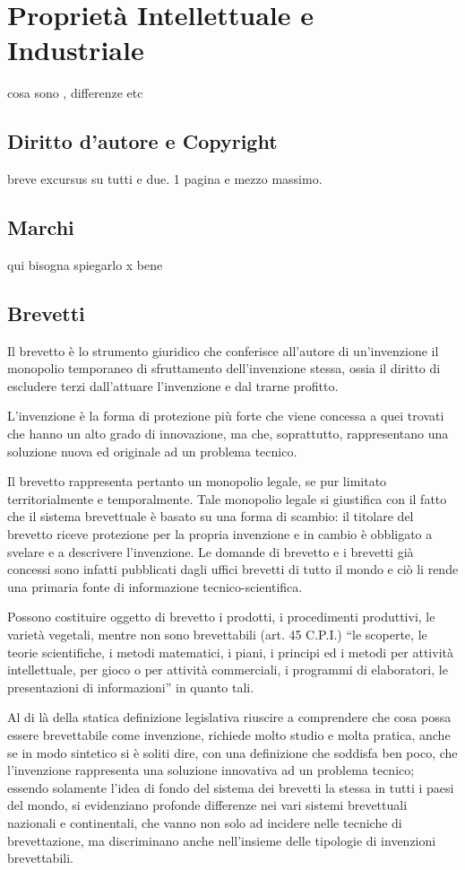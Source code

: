 \chapter{Proprietà Intellettuale e Industriale}
cosa sono , differenze etc
\section{Diritto d'autore e Copyright}
breve excursus su tutti e due. 1 pagina e mezzo massimo.
\section{Marchi}
qui bisogna spiegarlo x bene
\section{Brevetti}
Il brevetto è lo strumento giuridico che conferisce all'autore di un'invenzione il monopolio temporaneo di sfruttamento dell'invenzione stessa, ossia il diritto di escludere terzi dall'attuare l'invenzione e dal trarne profitto. 

L'invenzione è la forma di protezione più forte che viene concessa a quei trovati che hanno un alto grado di innovazione, ma che, soprattutto, rappresentano una soluzione nuova ed originale ad un problema tecnico.

Il brevetto rappresenta pertanto un monopolio legale, se pur limitato territorialmente e temporalmente. Tale monopolio legale si giustifica con il fatto che il sistema brevettuale è basato su una forma di scambio: il titolare del brevetto riceve protezione per la propria invenzione e in cambio è obbligato a svelare e a descrivere l'invenzione. Le domande di brevetto e i brevetti già concessi sono infatti pubblicati dagli uffici brevetti di tutto il mondo e ciò li rende una primaria fonte di informazione tecnico-scientifica.

Possono costituire oggetto di brevetto i prodotti, i procedimenti produttivi, le varietà vegetali, mentre non sono brevettabili (art. 45 C.P.I.) ``le scoperte, le teorie scientifiche, i metodi matematici, i piani, i principi ed i metodi per attività intellettuale, per gioco o per attività commerciali, i programmi di elaboratori, le presentazioni di informazioni'' in quanto tali. 

Al di là della statica definizione legislativa riuscire a comprendere che cosa possa essere brevettabile come invenzione, richiede molto studio e molta pratica, anche se in modo sintetico si è soliti dire, con una definizione che soddisfa ben poco, che l'invenzione rappresenta una soluzione innovativa ad un problema tecnico; essendo solamente l'idea di fondo del sistema dei brevetti la stessa in tutti i paesi del mondo, si evidenziano profonde differenze nei vari sistemi brevettuali nazionali e continentali, che vanno non solo ad incidere nelle tecniche di brevettazione, ma discriminano anche nell'insieme delle tipologie di invenzioni brevettabili.

